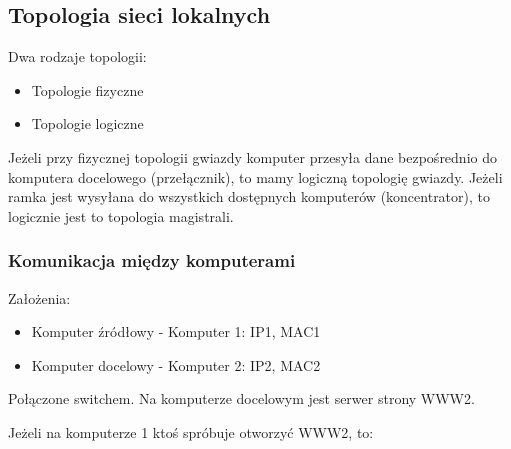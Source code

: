 \documentclass[a4paper]{article}
\begin{document}
\subsection{Topologia sieci lokalnych}
Dwa rodzaje topologii:
\begin{itemize}
    \item Topologie fizyczne
    \item Topologie logiczne
\end{itemize}

Jeżeli przy fizycznej topologii gwiazdy komputer przesyła dane bezpośrednio do komputera docelowego (przełącznik), to mamy logiczną topologię gwiazdy. Jeżeli ramka jest wysyłana do wszystkich dostępnych komputerów (koncentrator), to logicznie jest to topologia magistrali.

\subsubsection{Komunikacja między komputerami}

Założenia:
\begin{itemize}
    \item Komputer źródłowy - Komputer 1: IP1, MAC1
    \item Komputer docelowy - Komputer 2: IP2, MAC2
\end{itemize}
Połączone switchem. Na komputerze docelowym  jest serwer strony WWW2.

Jeżeli na komputerze 1 ktoś spróbuje otworzyć WWW2, to:
\end{document}
